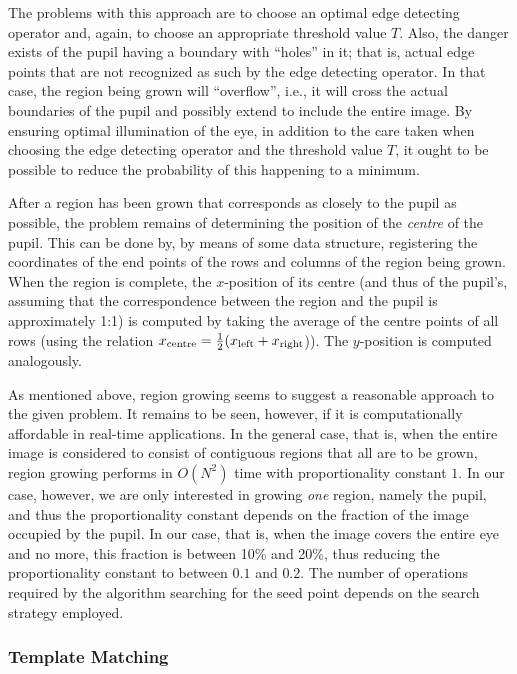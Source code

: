 The problems with this approach are to choose an optimal edge
detecting operator and, again, to choose an appropriate threshold
value $T$.  Also, the danger exists of the pupil having a boundary
with ``holes'' in it; that is, actual edge points that are not
recognized as such by the edge detecting operator.  In that case, the
region being grown will ``overflow'', i.e., it will cross the actual
boundaries of the pupil and possibly extend to include the entire
image.  By ensuring optimal illumination of the eye, in addition to
the care taken when choosing the edge detecting operator and the
threshold value $T$, it ought to be possible to reduce the probability
of this happening to a minimum.

After a region has been grown that corresponds as closely to the pupil
as possible, the problem remains of determining the position of the
{\em centre\/} of the pupil.  This can be done by, by means of some
data structure, registering the coordinates of the end points of the
rows and columns of the region being grown.  When the region is
complete, the $x$-position of its centre (and thus of the pupil's,
assuming that the correspondence between the region and the pupil is
approximately 1:1) is computed by taking the average of the centre
points of all rows (using the relation $x_{\mbox{\scriptsize
    centre}}=\frac{1}{2} (x_{\mbox{\scriptsize
    left}}+x_{\mbox{\scriptsize right}}$)).  The $y$-position is
computed analogously.

As mentioned above, region growing seems to suggest a reasonable
approach to the given problem.  It remains to be seen, however, if it
is computationally affordable in real-time applications.  In the
general case, that is, when the entire image is considered to consist
of contiguous regions that all are to be grown, region growing
performs in $O(N^{2})$ time with proportionality constant $1$.  In our
case, however, we are only interested in growing {\em one\/} region,
namely the pupil, and thus the proportionality constant depends on the
fraction of the image occupied by the pupil.  In our case, that is,
when the image covers the entire eye and no more, this fraction is
between 10\% and 20\%, thus reducing the proportionality constant to
between $0.1$ and $0.2$.  The number of operations required by the
algorithm searching for the seed point depends on the search strategy
employed.

\subsubsection{Template Matching}

